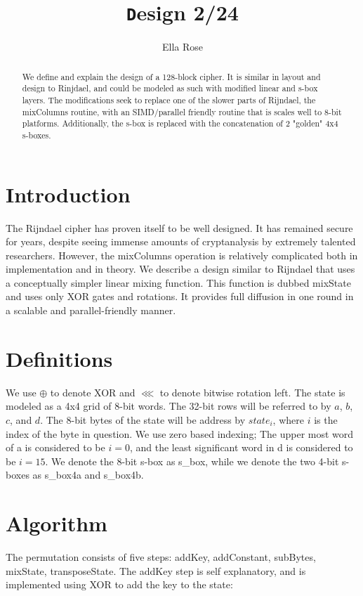 \documentclass[preprint]{iacrtrans}
\author{Ella Rose\inst{1}}
\institute{Paso Robles, California \email{python_pride@protonmail.com}}
\title[\texttt Design 2/24]{\texttt Design 2/24}
\begin{document}
\maketitle


\begin{abstract}
  We define and explain the design of a 128-block cipher. It is similar in layout and design to Rinjdael, and could be modeled as such with modified linear and s-box layers. The modifications seek to replace one of the slower parts of Rijndael, the mixColumns routine, with an SIMD/parallel friendly routine that is scales well to 8-bit platforms. Additionally, the s-box is replaced with the concatenation of 2 "golden" 4x4 s-boxes. 
\end{abstract}

\todototoc
\listoftodos

\section{Introduction}
The Rijndael cipher has proven itself to be well designed. It has remained secure for years, despite seeing immense amounts of cryptanalysis by extremely talented researchers. However, the mixColumns operation is relatively complicated both in implementation and in theory. We describe a design similar to Rijndael that uses a conceptually simpler linear mixing function. This function is dubbed mixState and uses only XOR gates and rotations. It provides full diffusion in one round in a scalable and parallel-friendly manner.

\section{Definitions}
We use $\oplus$ to denote XOR and $\lll$ to denote bitwise rotation left. The state is modeled as a 4x4 grid of 8-bit words. The 32-bit rows will be referred to by $a$, $b$, $c$, and $d$. The 8-bit bytes of the state will be address by $state_i$, where $i$ is the index of the byte in question. We use zero based indexing; The upper most word of a is considered to be $i = 0$, and the least significant word in d is considered to be $i = 15$. We denote the 8-bit s-box as s\_box, while we denote the two 4-bit s-boxes as s\_box4a and s\_box4b.

\section{Algorithm}
The permutation consists of five steps: addKey, addConstant, subBytes, mixState, transposeState. The addKey step is self explanatory, and is implemented using XOR to add the key to the state:
\end{document}
